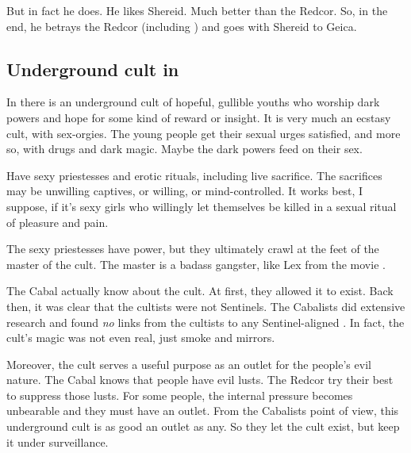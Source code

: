 But in fact he does. 
He likes Shereid. 
Much better than the Redcor. 
So, in the end, he betrays the Redcor (including \Racel) and goes with Shereid to Geica. 







\subsection{Underground cult in \Redce}
In \Redce{} there is an underground cult of hopeful, gullible youths who worship dark powers and hope for some kind of reward or insight. 
It is very much an ecstasy cult, with sex-orgies. 
The young people get their sexual urges satisfied, and more so, with drugs and dark magic. 
Maybe the dark powers feed on their sex. 

Have sexy priestesses and erotic rituals, including live sacrifice. 
The sacrifices may be unwilling captives, or willing, or mind-controlled. 
It works best, I suppose, if it's sexy girls who willingly let themselves be killed in a sexual ritual of pleasure and pain. 

The sexy priestesses have power, but they ultimately crawl at the feet of the master of the cult. 
The master is a badass gangster, like Lex from the movie \cite{Movie:GargoylesRevenge}. 


The Cabal actually know about the cult. 
At first, they allowed it to exist.
Back then, it was clear that the cultists were not Sentinels.
The Cabalists did extensive research and found \emph{no} links from the cultists to any Sentinel-aligned \matrices. 
In fact, the cult's magic was not even real, just smoke and mirrors. 

Moreover, the cult serves a useful purpose as an outlet for the people's evil nature. 
The Cabal knows that people have evil lusts. 
The Redcor try their best to suppress those lusts. 
For some people, the internal pressure becomes unbearable and they must have an outlet. 
From the Cabalists point of view, this underground cult is as good an outlet as any. 
So they let the cult exist, but keep it under surveillance. 


